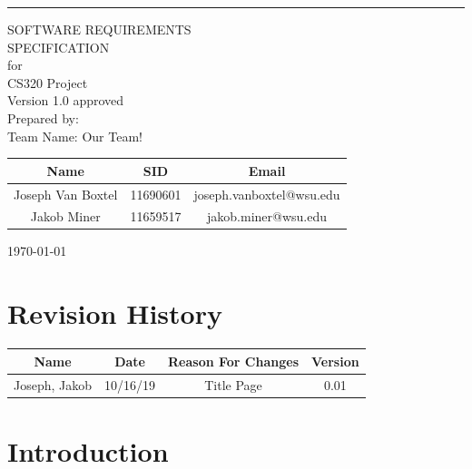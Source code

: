 \documentclass{scrreprt}
\date{}
\def\myversion{1.0 }
\begin{document}
\begin{flushright}
    \rule{16cm}{5pt}\vskip1cm
    \begin{bfseries}
        \Huge{SOFTWARE REQUIREMENTS\\ SPECIFICATION}\\
        \vspace{1.9cm}
        for\\
        \vspace{1.9cm}
       CS320 Project\\
        \vspace{1.9cm}
        \LARGE{Version \myversion approved}\\
        \vspace{1.9cm}
        Prepared by:\\
        Team Name: Our Team!
        \begin{center}
            \begin{tabular}{|c|c|c|}
                \hline
        	    Name & SID & Email\\
                \hline
        	    Joseph Van Boxtel & 11690601 & joseph.vanboxtel@wsu.edu\\
                \hline
        	    Jakob Miner & 11659517 & jakob.miner@wsu.edu\\
                \hline
            \end{tabular}
        \end{center}

        \vspace{1.9cm}
        \today\\
    \end{bfseries}
\end{flushright}

\tableofcontents


\chapter*{Revision History}

\begin{center}
    \begin{tabular}{|c|c|c|c|}
        \hline
	    Name & Date & Reason For Changes & Version\\
        \hline
	    Joseph, Jakob & 10/16/19 & Title Page & 0.01\\
        \hline
    \end{tabular}
\end{center}

\chapter{Introduction}
\end{document}
